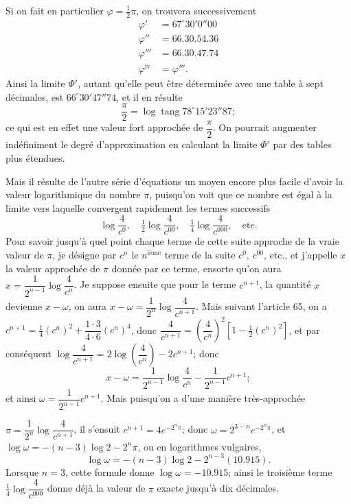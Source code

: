 \documentclass{article}
\begin{document}
Si on fait en particulier $\varphi=\frac{1}{2}\pi$, on trouvera successivement
\[ \begin{aligned} \varphi'&=67^{\circ}30'0''00\\ \varphi''&=66.30.54.36\\ \varphi'''&=66.30.47.74\\ \varphi^{\text{iv}}&=\varphi'''. \end{aligned} \]
Ainsi la limite $\Phi'$, autant qu'elle peut être déterminée avec une table à sept décimales, est $66^{\circ}30'47''74$, et il en résulte
\[ \frac{\pi}{2}=\log\operatorname{tang}78^{\circ}15'23''87; \]
ce qui est en effet une valeur fort approchée de $\dfrac{\pi}{2}$. On pourrait augmenter indéfiniment le degré d'approximation en calculant la limite $\Phi'$ par des tables plus étendues.

Mais il résulte de l'autre série d'équations un moyen encore plus facile d'avoir la valeur logarithmique du nombre $\pi$, puisqu'on voit que ce nombre est égal à la limite vers laquelle convergent rapidement les termes successifs
\[ \log\frac{4}{c^{0}},\quad \tfrac{1}{2}\log\frac{4}{c^{00}},\quad \tfrac{1}{4}\log\frac{4}{c^{000}},\quad \text{etc.} \]
Pour savoir jusqu'à quel point chaque terme de cette suite approche de la vraie valeur de $\pi$, je désigne par $c^{n}$ le $n^{\text{ième}}$ terme de la suite $c^{0}$, $c^{00}$, etc., et j'appelle $x$ la valeur approchée de $\pi$ donnée par ce terme, ensorte qu'on aura $x=\dfrac{1}{2^{n-1}}\log\dfrac{4}{c^{n}}$. Je suppose ensuite que pour le terme $c^{n+1}$, la quantité $x$ devienne $x-\omega$, on aura $x-\omega=\dfrac{1}{2^{n}}\log\dfrac{4}{c^{n+1}}$. Mais suivant l'article 65, on a $c^{n+1}=\frac{1}{4}(c^{n})^{2}+\dfrac{1\cdot3}{4\cdot6}(c^{n})^{4}$, donc $\dfrac{4}{c^{n+1}}=\left(\dfrac{4}{c^{n}}\right)^{2}[1-\frac{1}{2}(c^{n})^{2}]$, et par conséquent $\log\dfrac{4}{c^{n+1}}=2\log\left(\dfrac{4}{c^{n}}\right)-2c^{n+1}$; donc
\[ x-\omega=\frac{1}{2^{n-1}}\log\frac{4}{c^{n}}-\frac{1}{2^{n-1}}c^{n+1}; \]
et ainsi $\omega=\dfrac{1}{2^{n-1}}c^{n+1}$. Mais puisqu'on a d'une manière très-approchée

$\pi=\dfrac{1}{2^{n}}\log\dfrac{4}{c^{n+1}}$, il s'ensuit $c^{n+1}=4e^{-2^{n}\pi}$; donc $\omega=2^{3-n}e^{-2^{n}\pi}$, et $\log\omega=-(n-3)\log2-2^{n}\pi$, ou en logarithmes vulgaires,
\[ \log\omega=-(n-3)\log2-2^{n-3}(10.915). \]
Lorsque $n=3$, cette formule donne $\log\omega=-10.915$; ainsi le troisième terme $\frac{1}{4}\log\dfrac{4}{c^{000}}$ donne déjà la valeur de $\pi$ exacte jusqu'à dix décimales.
\end{document}
